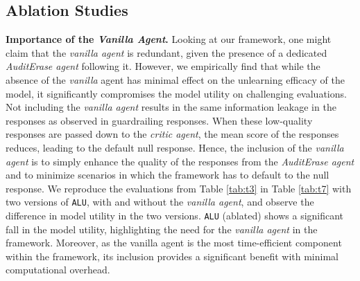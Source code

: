 \begin{table}[h]
\tiny
\footnotesize
\centering
\caption{Gradient Based methods on TOFU 10\% against control and ablated \texttt{ALU}}
\label{tab:t7}
\end{table}

\subsection{Ablation Studies}
\label{sec:ablation}
\textbf{Importance of the \emph{Vanilla Agent}.} Looking at our framework, one might claim that the \emph{vanilla agent} is redundant, given the presence of a dedicated \emph{AuditErase agent} following it. However, we empirically find that while the absence of the \emph{vanilla} agent has minimal effect on the unlearning efficacy of the model, it significantly compromises the model utility on challenging evaluations. Not including the \emph{vanilla agent} results in the same information leakage in the responses as observed in guardrailing responses. When these low-quality responses are passed down to the \emph{critic agent}, the mean score of the responses reduces, leading to the default null response. Hence, the inclusion of the \emph{vanilla agent} is to simply enhance the quality of the responses from the \emph{AuditErase agent} and to minimize scenarios in which the framework has to default to the null response. We reproduce the evaluations from Table \ref{tab:t3} in Table \ref{tab:t7}  with two versions of \texttt{ALU}, with and without the \emph{vanilla agent}, and observe the difference in model utility in the two versions. \texttt{ALU} (ablated) shows a significant fall in the model utility, highlighting the need for the \emph{vanilla agent} in the framework. Moreover, as the vanilla agent is the most time-efficient component within the framework, its inclusion provides a significant benefit with minimal computational overhead.\par

